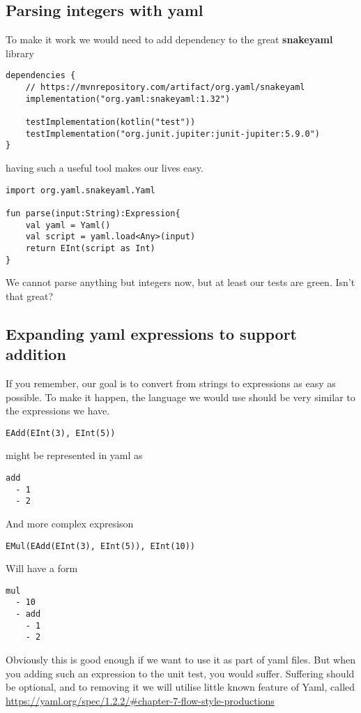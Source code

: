 \documentclass[11pt]{article}
\begin{document}
\subsection{Parsing integers with yaml}
\label{sec:org836065f}
To make it work we would need to add dependency to the great \textbf{snakeyaml} library
\begin{verbatim}
dependencies {
    // https://mvnrepository.com/artifact/org.yaml/snakeyaml
    implementation("org.yaml:snakeyaml:1.32")

    testImplementation(kotlin("test"))
    testImplementation("org.junit.jupiter:junit-jupiter:5.9.0")
}
\end{verbatim}

having such a useful tool makes our lives easy.

\begin{verbatim}
import org.yaml.snakeyaml.Yaml

fun parse(input:String):Expression{
    val yaml = Yaml()
    val script = yaml.load<Any>(input)
    return EInt(script as Int)
}
\end{verbatim}

We cannot parse anything but integers now, but at least our tests are green. Isn't that great?
\subsection{Expanding yaml expressions to support addition}
\label{sec:org4032bb3}
If you remember, our goal is to convert from strings to expressions as easy as possible.
To make it happen, the language we would use should be very similar to the expressions we have.

\begin{verbatim}
EAdd(EInt(3), EInt(5))
\end{verbatim}

might be represented in yaml as
\begin{verbatim}
add
  - 1
  - 2
\end{verbatim}

And more complex expresison
\begin{verbatim}
EMul(EAdd(EInt(3), EInt(5)), EInt(10))
\end{verbatim}
Will have a form
\begin{verbatim}
mul
  - 10
  - add
    - 1
    - 2
\end{verbatim}

Obviously this is good enough if we want to use it as part of yaml files.
But when you adding such an expression to the unit test, you would suffer.
Suffering should be optional, and to removing it we will utilise little known feature of Yaml, called \url{https://yaml.org/spec/1.2.2/\#chapter-7-flow-style-productions}
\end{document}
